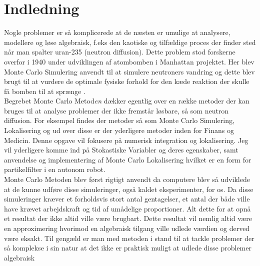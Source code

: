 \documentclass[../../SRP.tex]{subfiles}
\begin{document}
\chapter{Indledning}

Nogle problemer er så komplicerede at de næsten er umulige at analysere, modellere og løse algebraisk, f.eks den kaotiske og tilfældige proces der finder sted når man spalter uran-235 (neutron diffusion). Dette problem stod forskerne overfor i 1940 under udviklingen af atombomben i Manhattan projektet. Her blev Monte Carlo Simulering anvendt til at simulere neutroners vandring og dette blev brugt til at vurdere de optimale fysiske forhold for den kæde reaktion der skulle få bomben til at sprænge \cite{AHF}. \\

Begrebet Monte Carlo Metod\textit{en} dækker egentlig over en række metoder der kan bruges til at analyse problemer der ikke fremstår løsbare, så som neutron diffusion. For eksempel findes der metoder så som Monte Carlo Simulering, Lokalisering og ud over disse er der yderligere metoder inden for Finans og Medicin. Denne opgave vil fokusere på numerisk integration og lokalisering. Jeg vil yderligere komme ind på Stokastiske Variabler og deres egenskaber, samt anvendelse og implementering af Monte Carlo Lokalisering hvilket er en form for partikelfilter i en autonom robot. \\

Monte Carlo Metoden blev først rigtigt anvendt da computere blev så udviklede at de kunne udføre disse simuleringer, også kaldet eksperimenter, for os. Da disse simuleringer kræver et forholdsvis stort antal gentagelser, et antal der både ville have krævet arbejdskraft og tid af umådelige proportioner. Alt dette for at opnå et resultat der ikke altid ville være brugbart. Dette resultat vil nemlig altid være en approximering hvorimod en algebraisk tilgang ville udlede værdien og derved være eksakt. Til gengæld er man med metoden i stand til at tackle problemer der så komplekse i sin natur at det ikke er praktisk muligt at udlede disse problemer algebraisk \cite{SBM} \\
\end{document}

